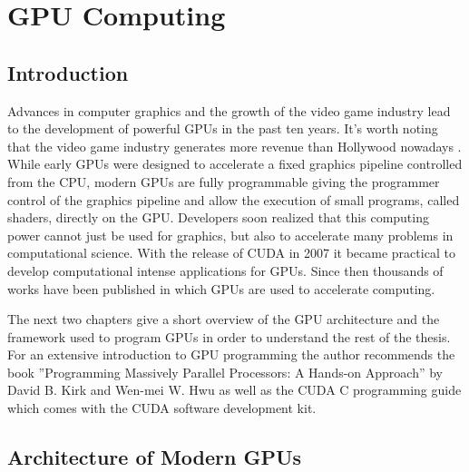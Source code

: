 \section{GPU Computing}
\label{sec:gpuComputing}

\subsection{Introduction}

Advances in computer graphics and the growth of the video game industry lead to the development of powerful GPUs in the past ten years. It's worth noting that the video game industry generates more revenue than Hollywood nowadays \cite{videogamesRevenue}. While early GPUs were designed to accelerate a fixed graphics pipeline controlled from the CPU, modern GPUs are fully programmable giving the programmer control of the graphics pipeline and allow the execution of small programs, called shaders, directly on the GPU. Developers soon realized that this computing power cannot just be used for graphics, but also to accelerate many problems in computational science. With the release of CUDA in 2007 it became practical to develop computational intense applications for GPUs. Since then thousands of works have been published in which GPUs are used to accelerate computing.

The next two chapters give a short overview of the GPU architecture and the framework used to program GPUs in order to understand the rest of the thesis. For an extensive introduction to GPU programming the author recommends the book  ''Programming Massively Parallel Processors: A Hands-on Approach'' by David B. Kirk and Wen-mei W. Hwu \cite{cudabook} as well as the CUDA C programming guide \cite{cudaguide} which comes with the CUDA software development kit.

\subsection{Architecture of Modern GPUs}
\label{sec:gpuArch}

